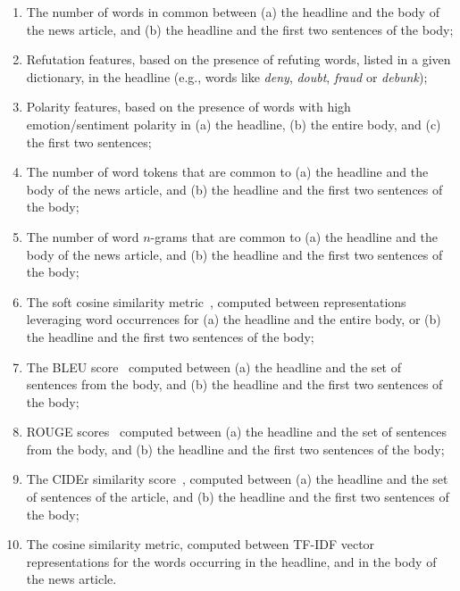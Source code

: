\begin{enumerate}
\item The number of words in common between (a) the headline and the body of the news article, and (b) the headline and the first two sentences of the body;

\item Refutation features, based on the presence of refuting words, listed in a given dictionary, in the headline (e.g., words like {\it deny}, {\it doubt}, {\it fraud} or {\it debunk});

\item Polarity features, based on the presence of words with high emotion/sentiment polarity in (a) the headline, (b) the entire body, and (c) the first two sentences;

\item The number of word tokens that are common to (a) the headline and the body of the news article, and (b) the headline and the first two sentences of the body;

\item The number of word $n$-grams that are common to (a) the headline and the body of the news article, and (b) the headline and the first two sentences of the body;

\item The soft cosine similarity metric~\cite{charlet2017simbow}, computed between representations leveraging word occurrences for (a) the headline and the entire body, or (b) the headline and the first two sentences of the body;

\item The BLEU score~\cite{bleu} computed between (a) the headline and the set of sentences from the body, and (b) the headline and the first two sentences of the body;

\item ROUGE scores~\cite{rouge} computed between (a) the headline and the set of sentences from the body, and (b) the headline and the first two sentences of the body;

\item The CIDEr similarity score~\cite{cider}, computed between (a) the headline and the set of sentences of the article, and (b) the headline and the first two sentences of the body;

\item The cosine similarity metric, computed between TF-IDF vector representations for the words occurring in the headline, and in the body of the news article.


\end{enumerate}
